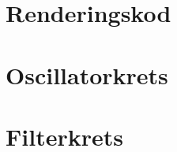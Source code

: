 \documentclass[a4paper]{article}
\begin{document}
\begin{sloppypar}
    \appendices
    \titleformat{\section}[display]
    {\normalfont\Large\bfseries}{\appendixname\enspace\thesection}{.5em}{} %
    \section{Renderingskod}

    \section{Oscillatorkrets}

    \section{Filterkrets}


\end{sloppypar}
\printbibliography[heading=none]
\end{document}
